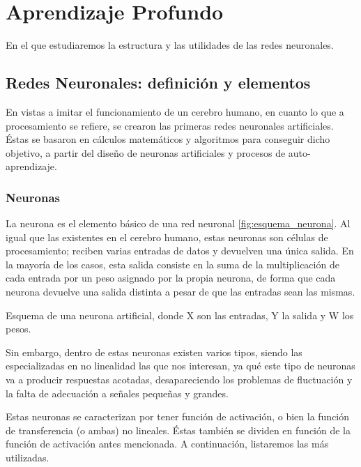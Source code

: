 \chapter{Aprendizaje Profundo}
\label{cap:deepLearning}

En el que estudiaremos la estructura y las utilidades de las redes neuronales. 


\section{Redes Neuronales: definición y elementos}
En vistas a imitar el funcionamiento de un cerebro humano, en cuanto lo que a procesamiento se refiere, se crearon las primeras redes neuronales artificiales. Éstas se basaron en cálculos matemáticos y algoritmos para conseguir dicho objetivo, a partir del diseño de neuronas artificiales y procesos de auto-aprendizaje.

\subsection{Neuronas}
La neurona es el elemento básico de una red neuronal \ref{fig:esquema_neurona}. Al igual que las existentes en el cerebro humano, estas neuronas son células de procesamiento; reciben varias entradas de datos y devuelven una única salida. En la mayoría de los casos, esta salida consiste en la suma de la multiplicación de cada entrada por un peso asignado por la propia neurona, de forma que cada neurona devuelve una salida distinta a pesar de que las entradas sean las mismas.

%
       {Esquema de una neurona artificial, donde X son las entradas, Y la salida y W los pesos.}

Sin embargo, dentro de estas neuronas existen varios tipos, siendo las especializadas en no linealidad las que nos interesan, ya qué este tipo de neuronas va a producir respuestas acotadas, desapareciendo los problemas de fluctuación y la falta de adecuación a señales pequeñas y grandes. 

Estas neuronas se caracterizan por tener función de activación, o bien la función de transferencia (o ambas) no lineales. Éstas también se dividen en función de la función de activación antes mencionada. A continuación, listaremos las más utilizadas.

